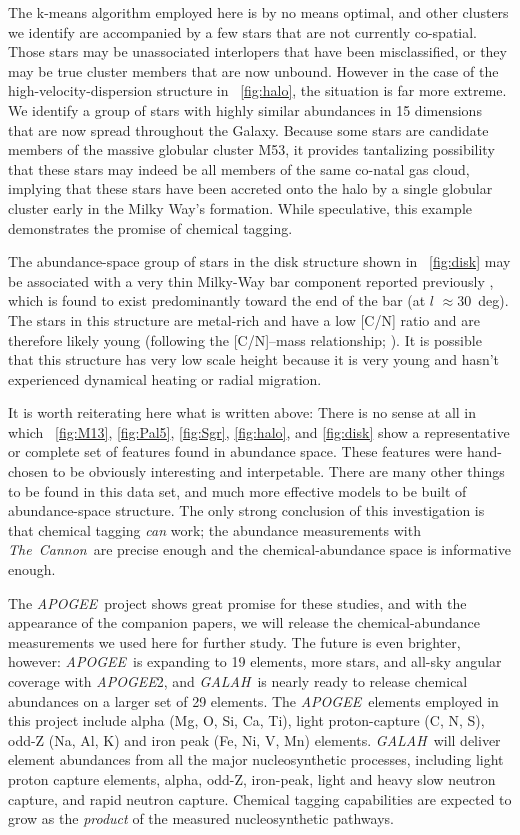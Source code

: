 \documentclass[12pt, letterpaper, preprint]{aastex}
\newcommand{\acronym}[1]{{\small{#1}}}
\newcommand{\project}[1]{\textsl{#1}}
\newcommand{\apogee}{\project{\acronym{APOGEE}}}
\newcommand{\galah}{\project{\acronym{GALAH}}}
\newcommand{\thecannon}{\project{The~Cannon}}
\begin{document}
The k-means algorithm employed here is by no means optimal, and other clusters
we identify are accompanied by a few stars that are not currently co-spatial.
Those stars may be unassociated interlopers that have been misclassified,
or they may be true cluster members that are now unbound. However in the
case of the high-velocity-dispersion structure in \figurename~\ref{fig:halo},
the situation is far more extreme. We identify a group of stars with
highly similar abundances in 15 dimensions that are now spread throughout
the Galaxy. Because some stars are candidate members of the massive globular
cluster M53, it provides tantalizing possibility that these stars may
indeed be all members of the same co-natal gas cloud, implying that 
these stars have been accreted onto the halo by a single globular
cluster early in the Milky Way's formation. While speculative,
this example demonstrates the promise of chemical tagging. 

The abundance-space group of stars in the disk structure shown in
\figurename~\ref{fig:disk} may be associated with a very thin
Milky-Way bar component reported previously \citep{wegg}, which is
found to exist predominantly toward the end of the bar (at $l$
$\approx 30$~deg).
The stars in this structure are metal-rich and have a low
[C/N] ratio and are therefore likely young (following the [C/N]--mass
relationship; \citealt{martig}).
It is possible that this structure has very low scale height because
it is very young and hasn't experienced dynamical heating or radial
migration.

It is worth reiterating here what is written above:
There is no sense at all in which \figurename~\ref{fig:M13},
\ref{fig:Pal5}, \ref{fig:Sgr}, \ref{fig:halo}, and \ref{fig:disk} show
a representative or complete set of features found in abundance space.
These features were hand-chosen to be obviously interesting and
interpetable.
There are many other things to be found in this data set, and much
more effective models to be built of abundance-space structure.
The only strong conclusion of this investigation is that chemical
tagging \emph{can} work; the abundance measurements with \thecannon\ are
precise enough and the chemical-abundance space is informative enough.

The \apogee\ project shows great promise for these studies, and with
the appearance of the companion papers, we will release the
chemical-abundance measurements we used here for further study.
The future is even brighter, however: \apogee\ is expanding to 19
elements, more stars, and all-sky angular coverage with \apogee2, and
\galah\ is nearly ready to release chemical abundances on a larger set
of 29 elements.
The \apogee\ elements employed in this project include alpha
(Mg, O, Si, Ca, Ti), light proton-capture (C, N, S), odd-Z (Na, Al, K)
and iron peak (Fe, Ni, V, Mn) elements.
\galah\ will deliver element abundances from all the major
nucleosynthetic processes, including light proton capture elements,
alpha, odd-Z, iron-peak, light and heavy slow neutron capture, and
rapid neutron capture.
Chemical tagging capabilities are expected to grow as the
\emph{product} of the measured nucleosynthetic pathways.
\end{document}
